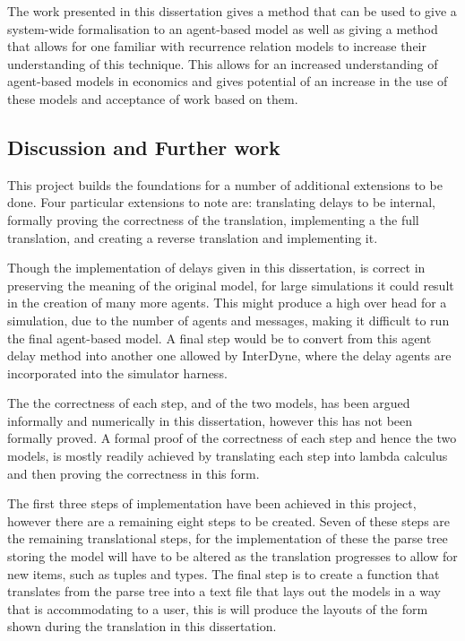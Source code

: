 \documentclass{article}
\begin{document}
The work presented in this dissertation gives a method that can be used to give a system-wide formalisation to an agent-based model as well as giving a method that allows for one familiar with recurrence relation models to increase their understanding of this technique. This allows for an increased understanding of agent-based models in economics and gives potential of an increase in the use of these models and acceptance of work based on them.   

\subsection{Discussion and Further work } \label{furtherwork}


This project builds the foundations for a number of additional extensions to be done. Four particular extensions to note are: translating delays to be internal, formally proving the correctness of the translation, implementing a the full translation, and creating a reverse translation and implementing it.     

Though the implementation of delays given in this dissertation, is correct in preserving the meaning of the original model, for large simulations it could result in the creation of many more agents. This might produce a high over head for a simulation, due to the number of agents and messages, making it difficult to run the final agent-based model. A final step would be to convert from this agent delay method into another one allowed by InterDyne, where the delay agents are incorporated into the simulator harness.  

The the correctness of each step, and of the two models, has been argued informally and numerically in this dissertation, however this has not been formally proved. A formal proof of the correctness of each step and hence the two models, is mostly readily achieved by translating each step into lambda calculus and then proving the correctness in this form. 

The first three steps of implementation have been achieved in this project, however there are a remaining eight steps to be created. Seven of these steps are the remaining translational steps, for the implementation of these the parse tree storing the model will have to be altered as the translation progresses to allow for new items, such as tuples and types. The final step is to create a function that translates from the parse tree into a text file that lays out the models in a way that is accommodating to a user, this is will produce the layouts of the form shown during the translation in this dissertation.    
\end{document}
